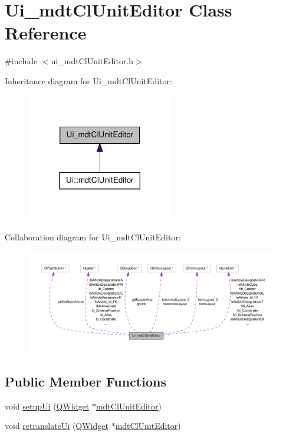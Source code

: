 \hypertarget{class_ui__mdt_cl_unit_editor}{\section{Ui\-\_\-mdt\-Cl\-Unit\-Editor Class Reference}
\label{class_ui__mdt_cl_unit_editor}
}


{\ttfamily \#include $<$ui\-\_\-mdt\-Cl\-Unit\-Editor.\-h$>$}



Inheritance diagram for Ui\-\_\-mdt\-Cl\-Unit\-Editor\-:\nopagebreak
\begin{figure}[H]
\begin{center}
\leavevmode
\includegraphics[width=182pt]{class_ui__mdt_cl_unit_editor__inherit__graph}
\end{center}
\end{figure}


Collaboration diagram for Ui\-\_\-mdt\-Cl\-Unit\-Editor\-:\nopagebreak
\begin{figure}[H]
\begin{center}
\leavevmode
\includegraphics[width=350pt]{class_ui__mdt_cl_unit_editor__coll__graph}
\end{center}
\end{figure}
\subsection*{Public Member Functions}
\begin{DoxyCompactItemize}
\item 
void \hyperlink{class_ui__mdt_cl_unit_editor_ac61041694ebae670c38887a1f4bb3246}{setup\-Ui} (\hyperlink{class_q_widget}{Q\-Widget} $\ast$\hyperlink{classmdt_cl_unit_editor}{mdt\-Cl\-Unit\-Editor})
\item 
void \hyperlink{class_ui__mdt_cl_unit_editor_a51f845530874a93db65a9052ccbb2aa8}{retranslate\-Ui} (\hyperlink{class_q_widget}{Q\-Widget} $\ast$\hyperlink{classmdt_cl_unit_editor}{mdt\-Cl\-Unit\-Editor})
\end{DoxyCompactItemize}
